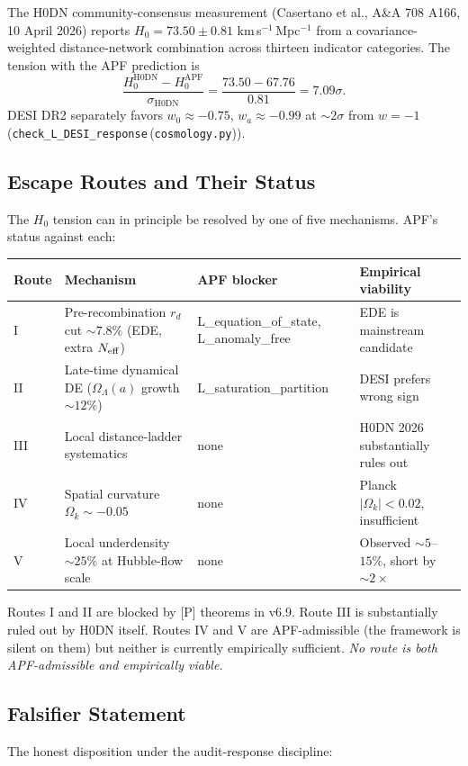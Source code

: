 \documentclass[11pt]{article}
\newcommand{\coderef}[2]{\texttt{#1}\,(\texttt{#2})}
\begin{document}
The H0DN community-consensus measurement (Casertano et al., A\&A 708 A166,
10 April 2026) reports $H_0 = 73.50 \pm 0.81$ km\,s$^{-1}$\,Mpc$^{-1}$
from a covariance-weighted distance-network combination across thirteen
indicator categories. The tension with the APF prediction is
\[
\frac{H_0^{\mathrm{H0DN}} - H_0^{\mathrm{APF}}}
     {\sigma_{\mathrm{H0DN}}}
= \frac{73.50 - 67.76}{0.81} = 7.09\sigma.
\]
DESI DR2 separately favors $w_0 \approx -0.75$, $w_a \approx -0.99$
at $\sim 2\sigma$ from $w = -1$
(\coderef{check\_L\_DESI\_response}{cosmology.py}).

\subsection{Escape Routes and Their Status}\label{sec:H0-routes}
The $H_0$ tension can in principle be resolved by one of five
mechanisms. APF's status against each:

\begin{center}
\begin{tabular}{@{}llll@{}}
\toprule
Route & Mechanism & APF blocker & Empirical viability \\
\midrule
I  & Pre-recombination $r_d$ cut $\sim 7.8\%$ (EDE, extra $N_{\rm eff}$) &
     L\_equation\_of\_state, L\_anomaly\_free &
     EDE is mainstream candidate \\
II & Late-time dynamical DE ($\Omega_\Lambda(a)$ growth $\sim 12\%$) &
     L\_saturation\_partition &
     DESI prefers wrong sign \\
III & Local distance-ladder systematics &
     none &
     H0DN 2026 substantially rules out \\
IV & Spatial curvature $\Omega_k \sim -0.05$ &
     none &
     Planck $|\Omega_k| < 0.02$, insufficient \\
V & Local underdensity $\sim 25\%$ at Hubble-flow scale &
     none &
     Observed $\sim 5$--$15\%$, short by $\sim 2\times$ \\
\bottomrule
\end{tabular}
\end{center}

Routes I and II are blocked by [P] theorems in v6.9. Route III is
substantially ruled out by H0DN itself. Routes IV and V are
APF-admissible (the framework is silent on them) but neither is currently
empirically sufficient. \emph{No route is both APF-admissible and
empirically viable.}

\subsection{Falsifier Statement}\label{sec:H0-falsifier}
The honest disposition under the audit-response discipline:
\end{document}
